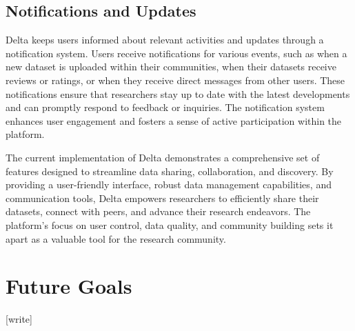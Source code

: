 \documentclass[conference]{IEEEtran}
\begin{document}
\subsection{Notifications and Updates}
Delta keeps users informed about relevant activities and updates through a notification system. Users receive notifications for various events, such as when a new dataset is uploaded within their communities, when their datasets receive reviews or ratings, or when they receive direct messages from other users. These notifications ensure that researchers stay up to date with the latest developments and can promptly respond to feedback or inquiries. The notification system enhances user engagement and fosters a sense of active participation within the platform.

The current implementation of Delta demonstrates a comprehensive set of features designed to streamline data sharing, collaboration, and discovery. By providing a user-friendly interface, robust data management capabilities, and communication tools, Delta empowers researchers to efficiently share their datasets, connect with peers, and advance their research endeavors. The platform's focus on user control, data quality, and community building sets it apart as a valuable tool for the research community.

\section{Future Goals}
[write]
\end{document}
